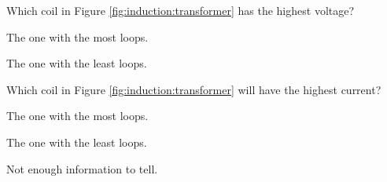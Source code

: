\begin{checkpoint}{}
	\begin{MCquestion}{Which coil in Figure \ref{fig:induction:transformer} has the highest voltage?}
		\item The one with the most loops. \correct
		\item The one with the least loops.
	\end{MCquestion}
\end{checkpoint}

\begin{checkpoint}{}
	\begin{MCquestion}{Which coil in Figure \ref{fig:induction:transformer} will have the highest current?}
		\item The one with the most loops.
		\item The one with the least loops. \correct
		\item Not enough information to tell.
	\end{MCquestion}
\end{checkpoint}
\vspace{0.5mm}

